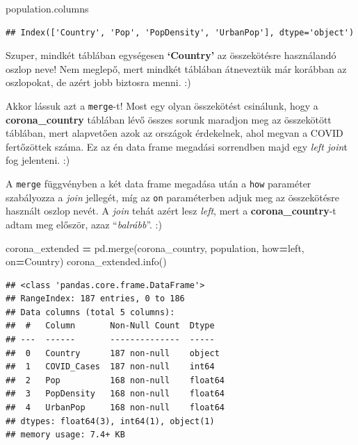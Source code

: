 \documentclass[
]{book}
\newenvironment{Shaded}{\begin{snugshade}}{\end{snugshade}}
\newcommand{\NormalTok}[1]{#1}
\newcommand{\OperatorTok}[1]{\textcolor[rgb]{0.81,0.36,0.00}{\textbf{#1}}}
\newcommand{\StringTok}[1]{\textcolor[rgb]{0.31,0.60,0.02}{#1}}
\begin{document}
\begin{Shaded}
\begin{Highlighting}[]
\NormalTok{population.columns}
\end{Highlighting}
\end{Shaded}

\begin{verbatim}
## Index(['Country', 'Pop', 'PopDensity', 'UrbanPop'], dtype='object')
\end{verbatim}

Szuper, mindkét táblában egységesen \textbf{`Country'} az összekötésre használandó oszlop neve! Nem meglepő, mert mindkét táblában átneveztük már korábban az oszlopokat, de azért jobb biztosra menni. :)

Akkor lássuk azt a \texttt{merge}-t! Most egy olyan összekötést csinálunk, hogy a \textbf{corona\_country} táblában lévő összes sorunk maradjon meg az összekötött táblában, mert alapvetően azok az országok érdekelnek, ahol megvan a COVID fertőzöttek száma. Ez az én data frame megadási sorrendben majd egy \emph{left join}t fog jelenteni. :)

A \texttt{merge} függvényben a két data frame megadása után a \texttt{how} paraméter szabályozza a \emph{join} jellegét, míg az \texttt{on} paraméterben adjuk meg az összekötésre használt oszlop nevét. A \emph{join} tehát azért lesz \emph{left}, mert a \textbf{corona\_country}-t adtam meg először, azaz ``\emph{balrább}''. :)

\begin{Shaded}
\begin{Highlighting}[]
\NormalTok{corona\_extended }\OperatorTok{=}\NormalTok{ pd.merge(corona\_country, population, how}\OperatorTok{=}\StringTok{\textquotesingle{}left\textquotesingle{}}\NormalTok{, on}\OperatorTok{=}\StringTok{\textquotesingle{}Country\textquotesingle{}}\NormalTok{)}
\NormalTok{corona\_extended.info()}
\end{Highlighting}
\end{Shaded}

\begin{verbatim}
## <class 'pandas.core.frame.DataFrame'>
## RangeIndex: 187 entries, 0 to 186
## Data columns (total 5 columns):
##  #   Column       Non-Null Count  Dtype  
## ---  ------       --------------  -----  
##  0   Country      187 non-null    object 
##  1   COVID_Cases  187 non-null    int64  
##  2   Pop          168 non-null    float64
##  3   PopDensity   168 non-null    float64
##  4   UrbanPop     168 non-null    float64
## dtypes: float64(3), int64(1), object(1)
## memory usage: 7.4+ KB
\end{verbatim}
\end{document}
